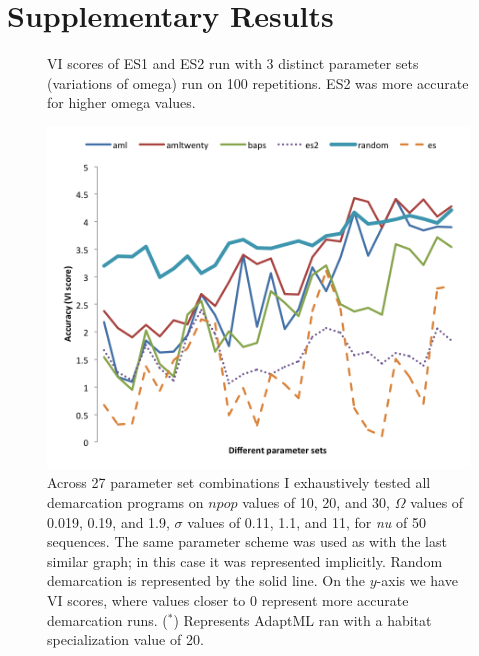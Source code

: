\chapter{Supplementary Results}
\begin{figure}[h!]
\centering
\noindent{}
\caption[Output file of ES1, ES2 comparison query.]{VI scores of ES1 and ES2 run with 3 distinct parameter sets (variations of omega) run on 100 repetitions. ES2 was more accurate for higher omega values.}
\label{fig:HundredResultsFile}
\end{figure}


\begin{figure}[h!]
  \centering
    \includegraphics[scale=0.75]{images/ResultGraphs/ResultGraphs-3}
      \caption[All demarcation graphical accuracy visualization on $nu = 50$.]{Across 27 parameter set combinations I exhaustively tested all demarcation programs on $npop$ values of 10, 20, and 30, $\Omega$ values of 0.019, 0.19, and 1.9, $\sigma$ values of 0.11, 1.1, and 11, for \emph{nu} of 50 sequences. The same parameter scheme was used as with the last similar graph; in this case it was represented implicitly. Random demarcation is represented by the solid line. On the $y$-axis we have VI scores, where values closer to 0 represent more accurate demarcation runs.  ($^\ast$) Represents AdaptML ran with a habitat specialization value of 20.}
    \label{fig:All50}
\end{figure}

